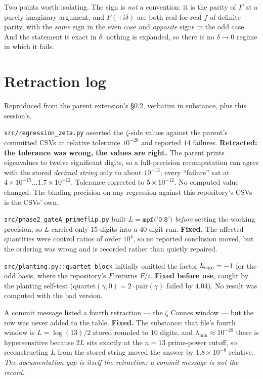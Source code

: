 \documentclass[11pt,a4paper]{article}
\theoremstyle{remark}
\newcommand{\src}[1]{{\footnotesize\texttt{#1}}}
\begin{document}
Two points worth isolating. The sign is \emph{not} a convention: it is the parity of $F$ at
a purely imaginary argument, and $F(\pm i\delta)$ are both real for real $f$ of definite
parity, with the \emph{same} sign in the even case and \emph{opposite} signs in the odd
case. And the statement is exact in $\delta$: nothing is expanded, so there is no
$\delta\to0$ regime in which it fails.

\section{Retraction log}\label{app:retr}

Reproduced from the parent extension's \S0.2, verbatim in substance, plus this session's.

\begin{description}\itemsep3pt
\item[R1.] \src{src/regression\_zeta.py} asserted the $\zeta$-side values against the
parent's committed CSVs at relative tolerance $10^{-20}$ and reported $14$ failures.
\textbf{Retracted: the tolerance was wrong, the values are right.} The parent prints
eigenvalues to twelve significant digits, so a full-precision recomputation can agree with
the stored \emph{decimal string} only to about $10^{-12}$; every ``failure'' sat at
$4\times10^{-15}\ldots1.7\times10^{-12}$. Tolerance corrected to $5\times10^{-12}$. No
computed value changed. The binding precision on any regression against this repository's
CSVs is the CSVs' own.

\item[R2.] \src{src/phase2\_gateA\_primeflip.py} built $L=\texttt{mpf('0.8')}$ \emph{before}
setting the working precision, so $L$ carried only $15$ digits into a $40$-digit run.
\textbf{Fixed.} The affected quantities were control ratios of order $10^4$, so no reported
conclusion moved, but the ordering was wrong and is recorded rather than quietly repaired.

\item[R3.] \src{src/planting.py::quartet\_block} initially omitted the factor
$h_{\rm sign}=-1$ for the odd basis, where the repository's $F$ returns $F/i$.
\textbf{Fixed before use}, caught by the planting self-test ($\mathrm{quartet}(\gamma,0)=
2\cdot\mathrm{pair}(\gamma)$ failed by $4.04$). No result was computed with the bad
version.

\item[R4.] A commit message listed a fourth retraction --- the $\zeta$ Connes window ---
but the row was never added to the table. \textbf{Fixed.} The substance: that file's fourth
window is $L=\log(13)/2$ stored rounded to $10$ digits, and $\lambda_{\min}\approx10^{-29}$
there is hypersensitive because $2L$ sits exactly at the $n=13$ prime-power cutoff, so
reconstructing $L$ from the stored string moved the answer by $1.8\times10^{-8}$ relative.
\emph{The documentation gap is itself the retraction: a commit message is not the record.}


\end{description}
\end{document}
